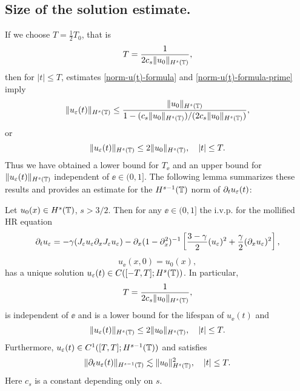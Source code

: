 	\subsection{  Size of the solution estimate.} If we choose  $T=\frac12 T_0$, that is
	\begin{equation} 
		\label{T-def}
		T
		=
		\frac{1}{2 c_s \|u_0\|_{H^s(\mathbb{T})}},
	\end{equation}
	then for $|t| \le T$, estimates \eqref{norm-u(t)-formula} and
	\eqref{norm-u(t)-formula-prime} imply 
	\begin{equation*} 
		\label{u(t)-u(0)-bound}
		\|u_\varepsilon(t)\|_{H^s(\mathbb{T})}
		\le
		\frac{ \|u_0\|_{H^s(\mathbb{T})}}{1-(c_s\|u_0\|_{H^s(\mathbb{T})})/(2 c_s \|u_0\|_{H^s(\mathbb{T})})},
	\end{equation*}
	or 
	\begin{equation} 
		\|u_\varepsilon(t)\|_{H^s(\mathbb{T})}
		\le
		  2 \|u_0\|_{H^s(\mathbb{T})},
		\quad 
		|t| \le T.
	\end{equation}
	Thus we have obtained a lower bound for $T_\ee$ and an upper bound for
	$\|u_\varepsilon(t)\|_{H^s(\mathbb{T})}$ independent of $\ee\in (0, 1]$. The following
	lemma summarizes these results and provides an estimate for the
	$H^{s-1}(\mathbb{T})$ norm of $\partial_t u_\varepsilon(t)$:
	\begin{lemma}
		\label{hr_wp}
		Let  $u_0(x) \in  H^s(\mathbb{T})$, $s >3/2$. Then for any $\ee\in (0, 1]$
		the i.v.p. for the mollified HR equation 
		\begin{equation} 
			\label{hr-moli-2}
			\partial_t  u_\varepsilon 
			=
			-\gamma (J_\varepsilon u_\varepsilon \partial_x  J_\varepsilon  u_\varepsilon) - \partial_x (1-\partial_x^2)^{-1} \left
			[\frac{3-\gamma}{2}(u_\varepsilon)^2 + \frac{\gamma}{2}(\partial_x u_\varepsilon)^2
			\right ], 
		\end{equation} 
		\begin{equation} 
			\label{burgers-moli-data-2} 
			u_\ee(x, 0) = u_0 (x),
		\end{equation}
		has a unique solution $u_\varepsilon( t)\in C([-T, T]; H^s(\mathbb{T}))$. 
		In particular,
		\begin{equation} 
			\label{life-est}
			T
			=
			\frac{1}{2 c_s \|u_0\|_{H^s(\mathbb{T})}},
		\end{equation}
		is independent of $\ee$ and
		is a lower bound for the lifespan of $u_\ee( t)$ and
		\begin{equation}
			\label{u-e-Hs-bound}
			\|u_\varepsilon(t)\|_{H^s(\mathbb{T})}
			\le
			2 \|u_0 \|_{H^s(\mathbb{T})},
			\quad
			|t| \le T.
		\end{equation}
		Furthermore,  $u_\varepsilon( t)\in C^1([T, T]; H^{s-1}(\mathbb{T}))$ and 
		satisfies
		\begin{equation}
			\label{dt-u-e-Hs-bound}
			\|\partial_t u_\varepsilon(t)\|_{H^{s-1}(\mathbb{T})}
			\lesssim
			\|u_0 \|_{H^s(\mathbb{T})}^2,
			\quad
			|t| \le T.
		\end{equation}
		Here  $c_s$ is a constant depending only on $s$.
	\end{lemma}
